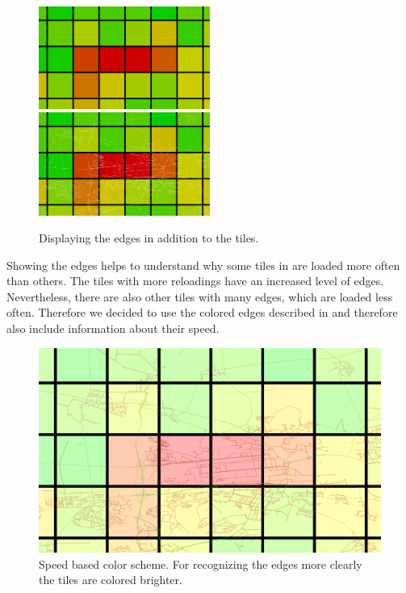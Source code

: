\documentclass
[
    paper = a4,
    pagesize,
    12 pt,
    oneside,                       %
    open = right,
    DIV = calc,
    BCOR = 0 mm,                   %
    bibtotoc
]
{scrbook}
\begin{document}
\begin{figure}
    \includegraphics[width=0.5\textwidth]{Images/vis-edges-no.png}
    \includegraphics[width=0.5\textwidth]{Images/vis-edges-white.png}
\caption[]{Displaying the edges in addition to the tiles.}
\label{fig:white edges}
\end{figure}

Showing the edges helps to understand why some tiles in  are loaded more often than others.
The tiles with more reloadings have an increased level of edges.
Nevertheless, there are also other tiles with many edges, which are loaded less often.
Therefore we decided to use the colored edges described in  and therefore also include information about their speed.

\begin{figure}
    \includegraphics[width=\textwidth]{Images/vis-edges-hsv.png}
\caption[]{Speed based color scheme. For recognizing the edges more clearly the tiles are colored brighter.}
\label{fig:colored edges}
\end{figure}
\end{document}
